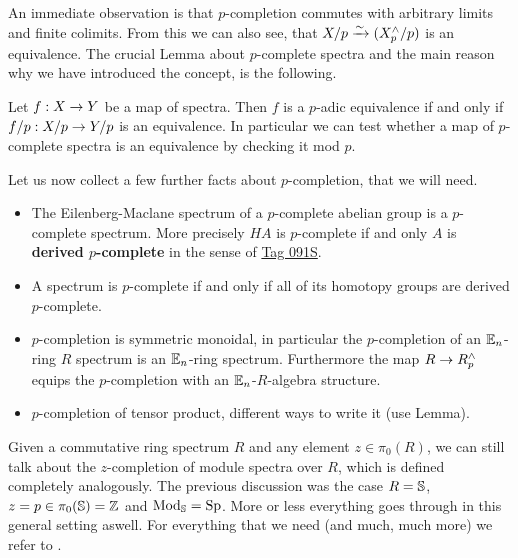 An immediate observation is that $p$-completion commutes with arbitrary limits and finite colimits. From this we can also see, that $X/p\rai (X_p^{\wedge}/p)$ is an equivalence. The crucial Lemma about $p$-complete spectra and the main reason why we have introduced the concept, is the following.
\begin{lem}
    Let $f:X\ra Y$ be a map of spectra. Then $f$ is a $p$-adic equivalence if and only if $f/p:X/p\ra Y/p$ is an equivalence. In particular we can test whether a map of $p$-complete spectra is an equivalence by checking it mod $p$. 
\end{lem}
Let us now collect a few further facts about $p$-completion, that we will need.
\begin{itemize}
    \item The Eilenberg-Maclane spectrum of a $p$-complete abelian group is a $p$-complete spectrum. More precisely $HA$ is $p$-complete if and only $A$ is \textbf{derived $p$-complete} in the sense of \href{https://stacks.math.columbia.edu/tag/091S}{Tag 091S}.
    \item A spectrum is $p$-complete if and only if all of its homotopy groups are derived $p$-complete.
    \item $p$-completion is symmetric monoidal, in particular the $p$-completion of an $\En$-ring $R$ spectrum is an $\En$-ring spectrum. Furthermore the map $R\ra R_p^{\wedge}$ equips the $p$-completion with an $\En$-$R$-algebra structure.
    \item $p$-completion of tensor product, different ways to write it (use Lemma).
\end{itemize}
Given a commutative ring spectrum $R$ and any element $z\in\pi_0(R)$, we can still talk about the $z$-completion of module spectra over $R$, which is defined completely analogously. The previous discussion was the case $R=\S$, $z=p\in\pi_0(\S)=\Z$ and $\Mod_\S=\Sp$. More or less everything goes through in this general setting aswell. For everything that we need (and much, much more) we refer to \cite[Section~7.3]{SAG}.

